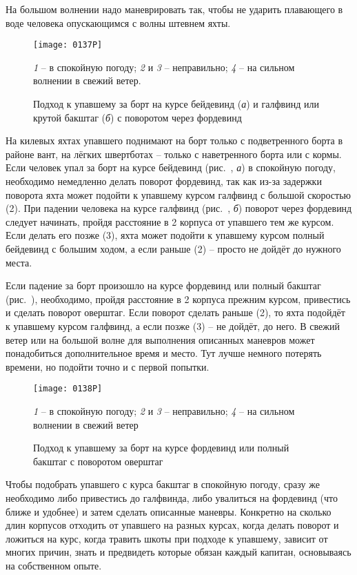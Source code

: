 На большом волнении надо маневрировать так, чтобы не ударить
плавающего в воде человека опускающимся с волны штевнем яхты.

\begin{figure*}[htb]
  \centering{}
  \texttt{[image: 0137P]}
  \caption{Подход к упавшему за борт на курсе бейдевинд (\textit{а}) и галфвинд или крутой бакштаг (\textit{б}) с поворотом через фордевинд}
  \label{fig:137}
  \small
  \centering{}
  \textit{1} \--- в спокойную погоду; \textit{2} и \textit{3} \--- неправильно; \textit{4} \--- на сильном волнении в свежий ветер.
\end{figure*}

На килевых яхтах упавшего поднимают на борт только с подветренного
борта в районе вант, на лёгких швертботах \--- только с наветренного
борта или с кормы. Если человек упал за борт на курсе бейдевинд
(рис.~, \textit{а}) в спокойную погоду, необходимо немедленно
делать поворот фордевинд, так как из-за задержки поворота яхта может
подойти к упавшему курсом галфвинд с большой скоростью (2). При
падении человека на курсе галфвинд (рис.~, \textit{б})
поворот через фордевинд следует начинать, пройдя расстояние в 2
корпуса от упавшего тем же курсом. Если делать его позже (3), яхта
может подойти к упавшему курсом полный бейдевинд с большим ходом, а
если раньше (2) \--- просто не дойдёт до нужного места.

Если падение за борт произошло на курсе фордевинд или полный бакштаг
(рис.~), необходимо, пройдя расстояние в 2 корпуса
прежним курсом, привестись и сделать поворот оверштаг. Если поворот
сделать раньше (2), то яхта подойдёт к упавшему курсом галфвинд, а
если позже (3) \--- не дойдёт, до него. В свежий ветер или на большой
волне для выполнения описанных маневров может понадобиться
дополнительное время и место. Тут лучше немного потерять времени, но
подойти точно и с первой попытки.

\begin{figure}[htb]
  \centering{}
  \texttt{[image: 0138P]}
  \caption{Подход к упавшему за борт на курсе фордевинд или полный бакштаг с поворотом оверштаг}
  \label{fig:138}
  \small
  \centering{}
  \textit{1} \--- в спокойную погоду; \textit{2} и \textit{3} \--- неправильно; \textit{4} \--- на сильном волнении в свежий ветер
\end{figure}

Чтобы подобрать упавшего с курса бакштаг в спокойную погоду, сразу же
необходимо либо привестись до галфвинда, либо увалиться на фордевинд
(что ближе и удобнее) и затем сделать описанные маневры. Конкретно на
сколько длин корпусов отходить от упавшего на разных курсах, когда
делать поворот и ложиться на курс, когда травить шкоты при подходе к
упавшему, зависит от многих причин, знать и предвидеть которые обязан
каждый капитан, основываясь на собственном опыте.

